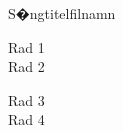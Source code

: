 \begin{song}{S�ngtitel}{filnamn}
\begin{vers}
Rad 1\\
Rad 2\\
\end{vers}
\begin{vers}
Rad 3\\
Rad 4\\
\end{vers}
\end{song}
